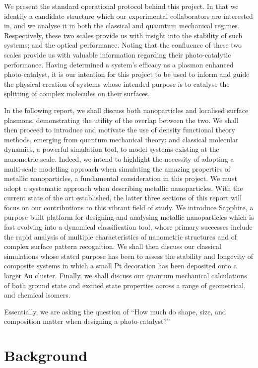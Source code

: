 We present the standard operational protocol behind this project. In that we identify a candidate structure which our experimental collaborators are interested in, and we analyse it in both the classical and quauntum mechanical regimes. Respectively, these two scales provide us with insight into the stability of such systems; and the optical performance. Noting that the confluence of these two scales provide us with valuable information regarding their photo-catalytic performance. Having determined a system's efficacy as a plasmon enhanced photo-catalyst, it is our intention for this project to be used to inform and guide the physical creation of systems whose intended purpose is to catalyse the splitting of complex molecules on their surfaces.

In the following report, we shall discuss both nanoparticles and localised surface plasmons, demonstrating the utility of the overlap between the two. We shall then proceed to introduce and motivate the use of density functional theory methods, emerging from quantum mechanical theory; and classical molecular dynamics, a powerful simulation tool, to model systems existing at the nanometric scale. Indeed, we intend to highlight the necessity of adopting a multi-scale modelling approach when  simulating the amazing properties of metallic nanoparticles, a fundamental consideration in this project. We must adopt a systematic approach when describing metallic nanoparticles. With the current state of the art established, the latter three sections of this report will focus on our contributions to this vibrant field of study. We introduce Sapphire, a purpose built platform for designing and analysing metallic nanoparticles which is fast evolving into a dynamical classification tool, whose primary successes include the rapid analysis of multiple characteristics of nanometric structures and of complex surface pattern recognition. We shall then discuss our classical simulations whose stated purpose has been to assess the stability and longevity of composite systems in which a small Pt decoration has been deposited onto a larger Au cluster. Finally, we shall discuss our quantum mechanical calculations of both ground state and excited state properties across a range of geometrical, and chemical isomers. 

Essentially, we are asking the question of ``How much do shape, size, and composition matter when designing a photo-catalyst?''

\section{Background}

